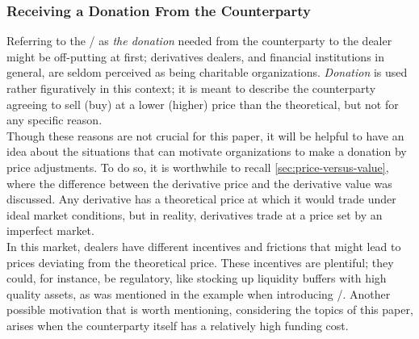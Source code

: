 \documentclass[main.tex]{subfiles}
\begin{document}
        \subsubsection*{Receiving a Donation From the Counterparty}

        Referring to the \FVA/ as \textit{the donation} needed from the counterparty to the dealer
        might be off-putting at first;
        derivatives dealers, and financial institutions in general, 
        are seldom perceived as being charitable organizations.
        \textit{Donation} is used rather figuratively in this context;
        it is meant to describe the counterparty agreeing 
        to sell (buy) at a lower (higher) price than the theoretical,
        but not for any specific reason.
        \\
        Though these reasons are not crucial for this paper,
        it will be helpful to have an idea about the situations that can motivate organizations
        to make a donation by price adjustments.
        To do so, it is worthwhile to recall \cref{sec:price-versus-value},
        where the difference between the derivative price and the derivative value was discussed.
        Any derivative has a theoretical price 
        at which it would trade under ideal market conditions,
        but in reality, derivatives trade at a price set by an imperfect market.
        \\
        In this market, dealers have different incentives and frictions
        that might lead to prices deviating from the theoretical price.
        These incentives are plentiful; they could, for instance, be regulatory, 
        like stocking up liquidity buffers with high quality assets,
        as was mentioned in the example when introducing \FVA/.
        Another possible motivation that is worth mentioning, considering the topics of this paper,
        arises when the counterparty itself has a relatively high funding cost.
\end{document}
